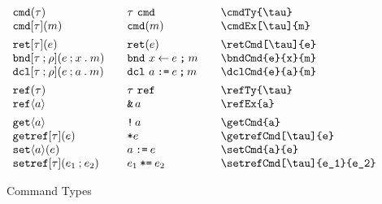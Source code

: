 \documentclass[11pt]{article}
\begin{document}
\begin{figure}

  \begin{small}
    \begin{displaymath}
      \begin{array}{l@{\qquad}l@{\qquad}l@{\qquad}l}
        \cmdTy{\tau}               & \cmdTy*{\tau}               & \verb|\cmdTy{\tau}|               \\
        \cmdEx[\tau]{m}            & \cmdEx*{m}                  & \verb|\cmdEx[\tau]{m}|            \\[1ex]
        \retCmd[\tau]{e}           & \retCmd*{e}                 & \verb|\retCmd[\tau]{e}|           \\
        \bndCmd{e}{x}{m}           & \bndCmd*{e}{x}{m}           & \verb|\bndCmd{e}{x}{m}|           \\
        \dclCmd{e}{a}{m}           & \dclCmd*{e}{a}{m}           & \verb|\dclCmd{e}{a}{m}|           \\[1ex]
        \refTy{\tau}               & \refTy*{\tau}               & \verb|\refTy{\tau}| \\
        \refEx{a}                  & \refEx*{a}                  & \verb|\refEx{a}|                  \\[1ex]
        \getCmd{a}                 & \getCmd*{a}                 & \verb|\getCmd{a}|                 \\
        \getrefCmd[\tau]{e}        & \getrefCmd*{e}              & \verb|\getrefCmd[\tau]{e}|        \\
        \setCmd{a}{e}              & \setCmd*{a}{e}              & \verb|\setCmd{a}{e}|              \\
        \setrefCmd[\tau]{e_1}{e_2} & \setrefCmd*[\tau]{e_1}{e_2} & \verb|\setrefCmd[\tau]{e_1}{e_2}|
      \end{array}
    \end{displaymath}
  \end{small}

  \caption{Command Types}
  \label{fig:cmd}
\end{figure}
\end{document}

